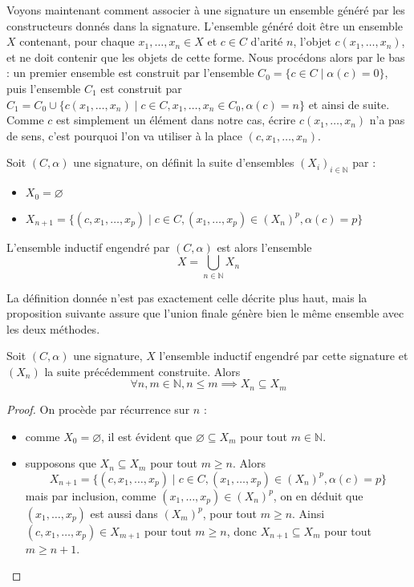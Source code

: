 Voyons maintenant comment associer à une signature un ensemble généré par les
constructeurs donnés dans la signature. L'ensemble généré doit être un ensemble
$X$ contenant, pour chaque $x_1,\ldots,x_n \in X$ et $c \in C$ d'arité $n$,
l'objet $c(x_1,\ldots,x_n)$, et ne doit contenir que les objets de cette forme.
Nous procédons alors par le bas : un premier ensemble est construit par
l'ensemble $C_0 = \{ c \in C \mid \alpha(c) = 0\}$, puis l'ensemble $C_1$ est
construit par $C_1 = C_0 \cup \{ c(x_1,\ldots,x_n) \mid c \in C, x_1,\ldots,
x_n \in C_0, \alpha(c) = n\}$ et ainsi de suite. Comme $c$ est simplement un
élément dans notre cas, écrire $c(x_1,\ldots,x_n)$ n'a pas de sens, c'est
pourquoi l'on va utiliser à la place $(c,x_1,\ldots,x_n)$.

\begin{definition}
  Soit $(C,\alpha)$ une signature, on définit la suite d'ensembles
  $(X_i)_{i\in\mathbb N}$ par :
  \begin{itemize}
  \item $X_0 = \varnothing$
  \item $X_{n+1} = \{ (c,x_1,\ldots,x_p) \mid c\in C, (x_1,\ldots,x_p)\in (X_n)^p,
    \alpha(c) = p \}$
  \end{itemize}

  L'ensemble inductif engendré par $(C,\alpha)$ est alors l'ensemble
  \[X = \bigcup_{n\in \mathbb N} X_n\]
\end{definition}

La définition donnée n'est pas exactement celle décrite plus haut, mais la
proposition suivante assure que l'union finale génère bien le même ensemble
avec les deux méthodes.

\begin{proposition}
  Soit $(C,\alpha)$ une signature, $X$ l'ensemble inductif engendré par cette
  signature et $(X_n)$ la suite précédemment construite. Alors
  \[\forall n,m \in \mathbb N, n \leq m \implies X_n \subseteq X_m\]
\end{proposition}

\begin{proof}
  On procède par récurrence sur $n$ :
  \begin{itemize}
  \item comme $X_0 = \varnothing$, il est évident que
    $\varnothing \subseteq X_m$ pour tout $m \in\mathbb N$.
  \item supposons que $X_n \subseteq X_m$ pour tout $m \geq n$. Alors
    \[X_{n+1} = \{(c,x_1,\ldots,x_p)\mid c\in C, (x_1,\ldots,x_p)\in(X_n)^p,
    \alpha(c) = p\}\]
    mais par inclusion, comme $(x_1,\ldots,x_p)\in (X_n)^p$, on en déduit que
    $(x_1,\ldots,x_p)$ est aussi dans $(X_m)^p$, pour tout $m \geq n$. Ainsi
    $(c,x_1,\ldots,x_p) \in X_{m+1}$ pour tout $m \geq n$, donc
    $X_{n+1}\subseteq X_m$ pour tout $m \geq n+1$.
  \end{itemize}
\end{proof}

